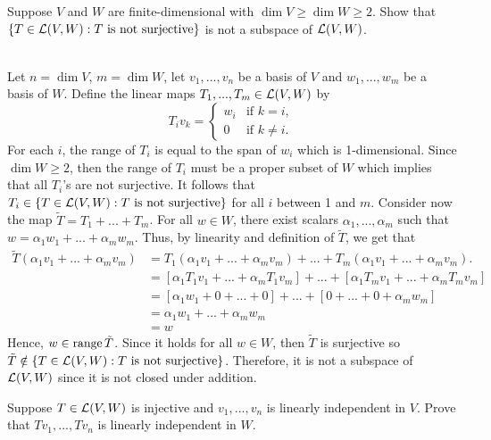 \begin{exercise}
    Suppose $V$ and $W$ are finite-dimensional with $\dim V \geq \dim W \geq 2$. Show that $\{T \in \mathcal{L}(V,W) : T \text{ is not surjective}\}$ is not a subspace of $\mathcal{L}(V,W)$. \\
\end{exercise}

\begin{solution}
    \\ Let $n = \dim V$, $m = \dim W$, let $v_1, ..., v_n$ be a basis of $V$ and $w_1, ..., w_m$ be a basis of $W$. Define the linear maps $T_1, ..., T_m \in \mathcal{L}(V,W)$ by $$T_i v_k = \begin{cases} w_i & \text{if } k= i, \\ 0 & \text{if } k \neq i. \end{cases}$$
    For each $i$, the range of $T_i$ is equal to the span of $w_i$ which is 1-dimensional. Since $\dim W \geq 2$, then the range of $T_i$ must be a proper subset of $W$ which implies that all $T_i$'s are not surjective. It follows that $T_i \in \{T \in \mathcal{L}(V,W) : T \text{ is not surjective}\}$ for all $i$ between 1 and $m$. Consider now the map $\tilde{T} = T_1 + ... + T_m$. For all $w \in W$, there exist scalars $\alpha_1, ..., \alpha_m$ such that $w = \alpha_1 w_1 + ... + \alpha_m w_m$. Thus, by linearity and definition of $\tilde{T}$, we get that
    \begin{align*}
        \tilde{T}(\alpha_1 v_1 + ... + \alpha_m v_m) &= T_1(\alpha_1 v_1 + ... + \alpha_m v_m) + ... + T_m(\alpha_1 v_1 + ... + \alpha_m v_m). \\
        &= [\alpha_1 T_1v_1 + ... + \alpha_m T_1v_m] + ... + [\alpha_1 T_mv_1 + ... + \alpha_m T_mv_m] \\
        &= [\alpha_1 w_1 + 0 + ... + 0] + ... + [0 + ... + 0 + \alpha_m w_m] \\
        &= \alpha_1 w_1 + ... + \alpha_m w_m \\
        &= w
    \end{align*}
    Hence, $w \in \operatorname{\text{range}} \tilde{T}$. Since it holds for all $w \in W$, then $\tilde{T}$ is surjective so $\tilde{T} \notin \{T \in \mathcal{L}(V,W) : T \text{ is not surjective}\}$. Therefore, it is not a subspace of $\mathcal{L}(V,W)$ since it is not closed under addition. \\
\end{solution}

\begin{exercise}
    Suppose $T \in \mathcal{L}(V,W)$ is injective and $v_1, ..., v_n$ is linearly independent in $V$. Prove that $Tv_1, ..., Tv_n$ is linearly independent in $W$. \\
\end{exercise}

